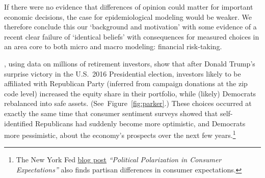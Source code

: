 If there were no evidence that differences of opinion could matter for important economic decisions, the case for epidemiological modeling would be weaker.  We therefore conclude this our `background and motivation' with some evidence of a recent clear failure of `identical beliefs' with consequences for measured choices in an area core to both micro and macro modeling: financial risk-taking.

\href{https://github.com/iworld1991/EpiExp/blob/master/Literature/meeuwis2018belief.pdf}{\cite{meeuwis2018belief}}, using data on millions of retirement investors, show that after Donald Trump's surprise victory in the U.S.\ 2016 Presidential election, investors likely to be affiliated with Republican Party (inferred from  campaign donations at the zip code level) increased the equity share in their portfolio, while (likely) Democrats rebalanced into safe assets. (See~Figure~\ref{fig:parker}.)  These choices occurred at exactly the same time that consumer sentiment surveys showed that self-identified Republicans had suddenly become more optimistic, and Democrats more pessimistic, about the economy's prospects over the next few years.\footnote{The New York Fed \href{https://libertystreeteconomics.newyorkfed.org/2017/12/political-polarization-in-consumer-expectation'}{blog post} \textit{``Political Polarization in Consumer Expectations''} also finds partisan differences in consumer expectations.}



